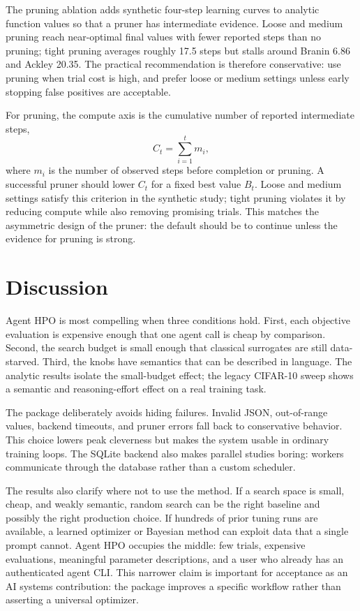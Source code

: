 \documentclass[letterpaper]{article}
\begin{document}
The pruning ablation adds synthetic four-step learning curves to analytic
function values so that a pruner has intermediate evidence. Loose and medium
pruning reach near-optimal final values with fewer reported steps than no
pruning; tight pruning averages roughly 17.5 steps but stalls around Branin
6.86 and Ackley 20.35. The practical recommendation is therefore conservative:
use pruning when trial cost is high, and prefer loose or medium settings unless
early stopping false positives are acceptable.

For pruning, the compute axis is the cumulative number of reported intermediate
steps,
\begin{equation}
  C_t=\sum_{i=1}^{t} m_i ,
\end{equation}
where $m_i$ is the number of observed steps before completion or pruning. A
successful pruner should lower $C_t$ for a fixed best value $B_t$. Loose and
medium settings satisfy this criterion in the synthetic study; tight pruning
violates it by reducing compute while also removing promising trials. This
matches the asymmetric design of the pruner: the default should be to continue
unless the evidence for pruning is strong.

\section{Discussion}

Agent HPO is most compelling when three conditions hold. First, each objective
evaluation is expensive enough that one agent call is cheap by comparison.
Second, the search budget is small enough that classical surrogates are still
data-starved. Third, the knobs have semantics that can be described in language.
The analytic results isolate the small-budget effect; the legacy CIFAR-10 sweep
shows a semantic and reasoning-effort effect on a real training task.

The package deliberately avoids hiding failures. Invalid JSON, out-of-range
values, backend timeouts, and pruner errors fall back to conservative behavior.
This choice lowers peak cleverness but makes the system usable in ordinary
training loops. The SQLite backend also makes parallel studies boring: workers
communicate through the database rather than a custom scheduler.

The results also clarify where not to use the method. If a search space is
small, cheap, and weakly semantic, random search can be the right baseline and
possibly the right production choice. If hundreds of prior tuning runs are
available, a learned optimizer or Bayesian method can exploit data that a
single prompt cannot. Agent HPO occupies the middle: few trials, expensive
evaluations, meaningful parameter descriptions, and a user who already has an
authenticated agent CLI. This narrower claim is important for acceptance as an
AI systems contribution: the package improves a specific workflow rather than
asserting a universal optimizer.
\end{document}
